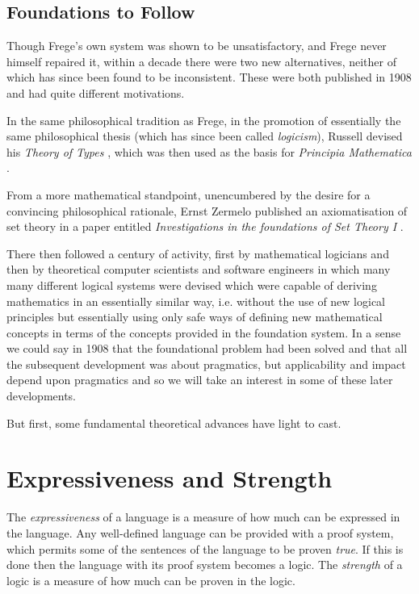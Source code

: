 
\subsection{Foundations to Follow}

Though Frege's own system was shown to be unsatisfactory, and Frege never himself repaired it, within a decade there were two new alternatives, neither of which has since been found to be inconsistent.
These were both published in 1908 and had quite different motivations.

In the same philosophical tradition as Frege, in the promotion of essentially the same philosophical thesis (which has since been called {\it logicism}), Russell devised his {\it Theory of Types} \cite{russell1908}, which was then used as the basis for {\it Principia Mathematica} \cite{russell1913}.

From a more mathematical standpoint, unencumbered by the desire for a convincing philosophical rationale, Ernst Zermelo published an axiomatisation of set theory in a paper entitled {\it Investigations in the foundations of Set Theory I} \cite{zermelo1908}.

There then followed a century of activity, first by mathematical logicians and then by theoretical computer scientists and software engineers in which many many different logical systems were devised which were capable of deriving mathematics in an essentially similar way, i.e. without the use of new logical principles but essentially using only safe ways of defining new mathematical concepts in terms of the concepts provided in the foundation system.
In a sense we could say in 1908 that the foundational problem had been solved and that all the subsequent development was about pragmatics, but applicability and impact depend upon pragmatics and so we will take an interest in some of these later developments.

But first, some fundamental theoretical advances have light to cast.

\section{Expressiveness and Strength}

The {\it expressiveness} of a language is a measure of how much can be expressed in the language.
Any well-defined language can be provided with a proof system, which permits some of the sentences of the language to be proven {\it true}.
If this is done then the language with its proof system becomes a logic.
The {\it strength} of a logic is a measure of how much can be proven in the logic.


